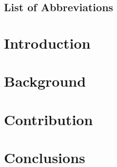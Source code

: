 \documentclass[pdf,watermark]{isg-thesis}
\begin{document}
\chapter*{List of Abbreviations}

\clearpage

\fi

\part{Introduction}


\part{Background}


\part{Contribution}


\part{Conclusions}


\pagestyle{plain}



\begin{appendix}
  
\end{appendix}
\end{document}
